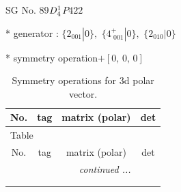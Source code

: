 \documentclass[fleqn,8pt]{jsarticle}
\begin{document}
\setcounter{MaxMatrixCols}{32}

\renewcommand{\tablename}{Table~}
\renewcommand{\figurename}{Figure~}
\begin{center}
\LARGE
SG No. 89\quad$D_{\rm 4}^{1}$\quad$P422$\quad[ tetragonal ]
\end{center}

* generator : $\{2{}_{001}|0\},\,\,\{4^{+}_{\,\,001}|0\},\,\,\{2{}_{010}|0\}$

* symmetry operation\quad$+\left[ 0,\, 0,\, 0 \right]$
\renewcommand{\arraystretch}{1.3}
\begin{longtable}{cccc}
\caption{Symmetry operations for 3d polar vector.}
 \\
 \hline \hline
No. & tag & matrix (polar) & det \\ \hline \endfirsthead

\multicolumn{3}{l}{\tablename\ \thetable{}} \\
 \hline \hline
No. & tag & matrix (polar) & det \\ \hline \endhead

 \hline \hline
\multicolumn{3}{r}{\footnotesize\it continued ...} \\ \endfoot

 \hline \hline
\multicolumn{3}{r}{} \\ \endlastfoot


\end{longtable}
\end{document}
